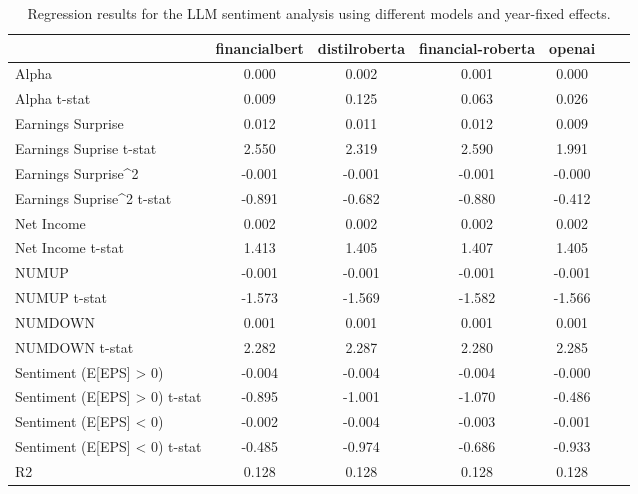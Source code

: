 \begin{table}
\caption{Regression results for the LLM sentiment analysis using different models and year-fixed effects.}
\label{tab:llm_regressions_split_year_fixed}
\begin{tabular}{lcccccc}
\toprule
 & financialbert & distilroberta & financial-roberta & openai \\
\midrule
Alpha & 0.000 & 0.002 & 0.001 & 0.000 \\
Alpha t-stat & 0.009 & 0.125 & 0.063 & 0.026 \\
Earnings Surprise & 0.012 & 0.011 & 0.012 & 0.009 \\
Earnings Suprise t-stat & 2.550 & 2.319 & 2.590 & 1.991 \\
Earnings Surprise^2 & -0.001 & -0.001 & -0.001 & -0.000 \\
Earnings Suprise^2 t-stat & -0.891 & -0.682 & -0.880 & -0.412 \\
Net Income & 0.002 & 0.002 & 0.002 & 0.002 \\
Net Income t-stat & 1.413 & 1.405 & 1.407 & 1.405 \\
NUMUP & -0.001 & -0.001 & -0.001 & -0.001 \\
NUMUP t-stat & -1.573 & -1.569 & -1.582 & -1.566 \\
NUMDOWN & 0.001 & 0.001 & 0.001 & 0.001 \\
NUMDOWN t-stat & 2.282 & 2.287 & 2.280 & 2.285 \\
Sentiment (E[EPS] > 0) & -0.004 & -0.004 & -0.004 & -0.000 \\
Sentiment (E[EPS] > 0) t-stat & -0.895 & -1.001 & -1.070 & -0.486 \\
Sentiment (E[EPS] < 0) & -0.002 & -0.004 & -0.003 & -0.001 \\
Sentiment (E[EPS] < 0) t-stat & -0.485 & -0.974 & -0.686 & -0.933 \\
R2 & 0.128 & 0.128 & 0.128 & 0.128 \\
\bottomrule
\end{tabular}
\end{table}

